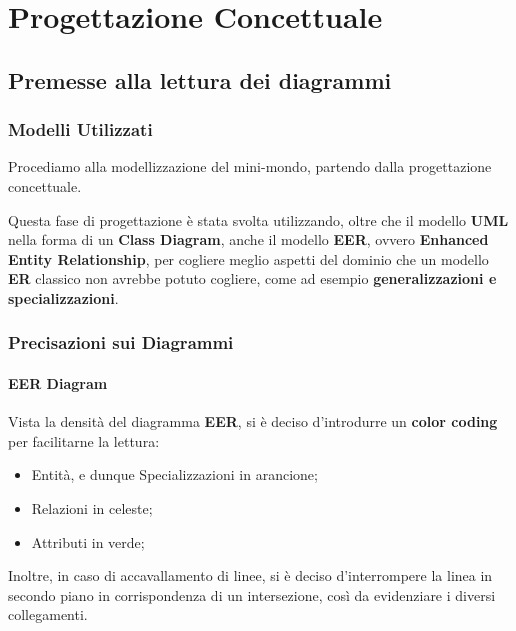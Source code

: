 \chapter{Progettazione Concettuale}

\section{Premesse alla lettura dei diagrammi}

\subsection{Modelli Utilizzati}

Procediamo alla modellizzazione del mini-mondo, partendo dalla progettazione concettuale.

Questa fase di progettazione è stata svolta utilizzando, oltre che il modello \textbf{UML} nella forma di un \textbf{Class Diagram}, anche il modello \textbf{EER}, ovvero \textbf{Enhanced Entity Relationship}, per cogliere meglio aspetti del dominio che un modello \textbf{ER} classico non avrebbe potuto cogliere, come ad esempio \textbf{generalizzazioni e specializzazioni}.

\subsection{Precisazioni sui Diagrammi}

\subsubsection{EER Diagram}
Vista la densità del diagramma \textbf{EER}, si è deciso d'introdurre un \textbf{color coding} per facilitarne la lettura:

\begin{itemize}
  \item \textcolor{PRIMARY}{Entità}, e dunque Specializzazioni in \textcolor{PRIMARY}{arancione};
  \item \textcolor{CONTRAST}{Relazioni} in \textcolor{CONTRAST}{celeste};
  \item \textcolor{NEWGREEN}{Attributi} in \textcolor{NEWGREEN}{verde};
\end{itemize}

Inoltre, in caso di accavallamento di linee, si è deciso d'interrompere la linea in secondo piano in corrispondenza di un intersezione, così da evidenziare i diversi collegamenti.

